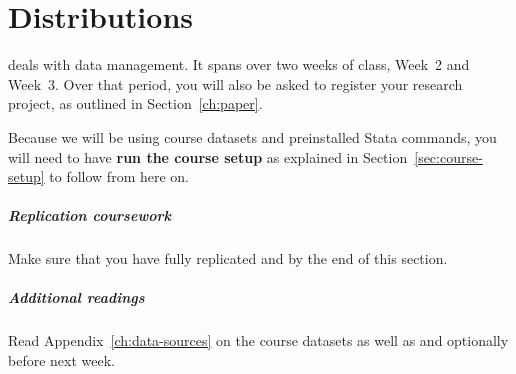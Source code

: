 %
%
\chapter{Distributions}%
	\label{ch:distr}%
  \begin{mybox}
     deals with data management. It spans over two weeks of class, Week~2 and Week~3. Over that period, you will also be asked to register your research project, as outlined in Section~\ref{ch:paper}.%
  
    Because we will be using course datasets and preinstalled Stata commands, you will need to have \textbf{run the course setup} as explained in Section~\ref{sec:course-setup} to follow from here on.%

    \paragraph{Replication coursework} %
    Make sure that you have fully replicated  and  by the end of this section.%

    \paragraph{Additional readings} %
    Read Appendix~\ref{ch:data-sources} on the course datasets as well as \cite[ch.~2--3]{Urdan:2010a} and optionally \cite[ch.~2.1--2.4]{FeinsteinThomas:2002d} before next week.%
  \end{mybox}
  \startcontents[chapters]%
	\newpage



%
%
%
%
%
%
% 
%


\stopcontents[chapters]
